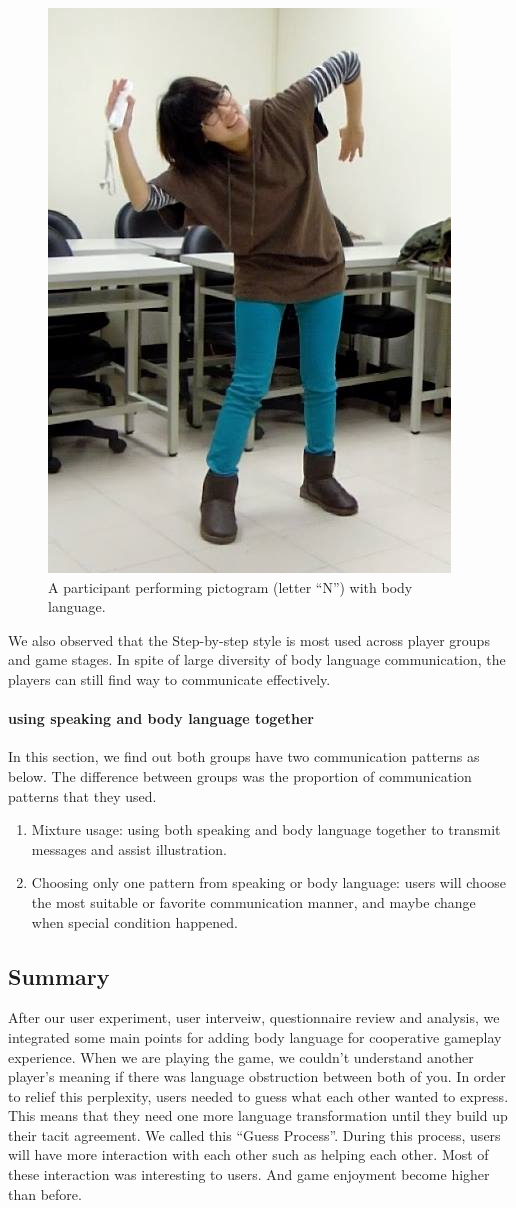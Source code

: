 \begin{figure}[!h]
\centering
\includegraphics[width=0.4\columnwidth]{Figures/US_F3.jpg}
\caption{A participant performing pictogram (letter ``N'') with body language.}
\label{fig:US_F3}
\end{figure}

We also observed that the Step-by-step style is most used across player groups and game stages. In spite of large diversity of body language communication, the players can still find way to communicate effectively.

\paragraph{using speaking and body language together}
In this section, we find out both groups have two communication patterns as below. The difference between groups was the proportion of communication patterns that they used.

\begin{enumerate}
  \item Mixture usage: using both speaking and body language together to transmit messages and assist illustration.

  \item Choosing only one pattern from speaking or body language: users will choose the most suitable or favorite communication manner, and maybe change when special condition happened.
\end{enumerate}


\subsection{Summary}
After our user experiment, user interveiw, questionnaire review and analysis, we integrated some main points for adding body language for cooperative gameplay experience. When we are playing the game, we couldn't understand another player's meaning if there was language obstruction between both of you. In order to relief this perplexity, users needed to guess what each other wanted to express. This means that they need one more language transformation until they build up their tacit agreement. We called this ``Guess Process''. During this process, users will have more interaction with each other such as helping each other. Most of these interaction was interesting to users. And 
game enjoyment become higher than before.

